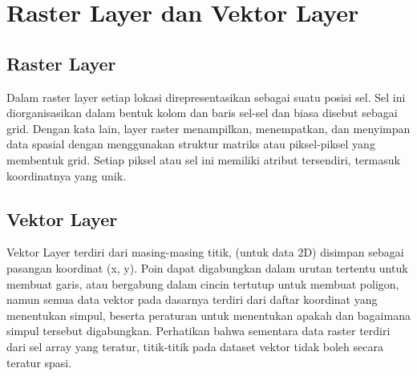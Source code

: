 \section{Raster Layer dan Vektor Layer}

\subsection{Raster Layer}
Dalam raster layer  setiap lokasi direpresentasikan sebagai suatu posisi sel. 
Sel ini diorganisasikan dalam bentuk kolom dan baris sel-sel dan biasa disebut sebagai grid. 
Dengan kata lain,  layer raster menampilkan, menempatkan, 
dan menyimpan data spasial dengan menggunakan struktur matriks atau piksel-piksel yang membentuk grid. 
Setiap piksel atau sel ini memiliki atribut tersendiri, termasuk koordinatnya yang unik.

\subsection{Vektor Layer}
Vektor Layer terdiri dari masing-masing titik, (untuk data 2D) disimpan sebagai pasangan koordinat (x, y). 
Poin dapat digabungkan dalam urutan tertentu untuk membuat garis, atau bergabung dalam cincin tertutup untuk 
membuat poligon, namun semua data vektor pada dasarnya terdiri dari daftar koordinat yang menentukan simpul, 
beserta peraturan untuk menentukan apakah dan bagaimana simpul tersebut digabungkan. 
Perhatikan bahwa sementara data raster terdiri dari sel array yang teratur, 
titik-titik pada dataset vektor tidak boleh secara teratur spasi.
